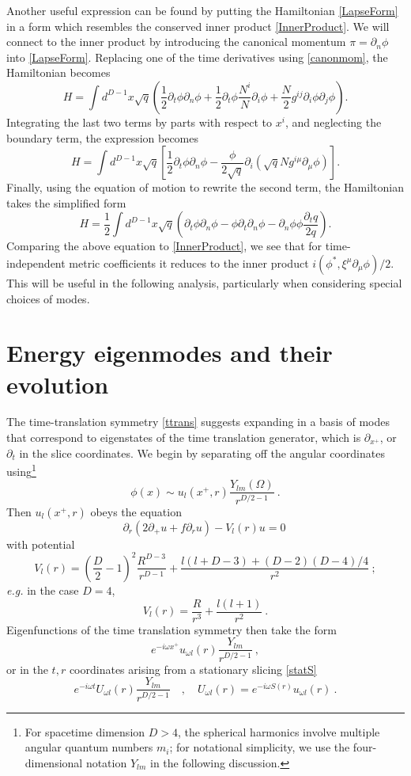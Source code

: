 \documentclass[12pt]{article}
\numberwithin{equation}{section}
\newcommand{\beq}{\begin{equation}}
\newcommand{\eeq}{\end{equation}}
\begin{document}
Another  useful expression can be found by putting the Hamiltonian \eqref{LapseForm} in a form which resembles the conserved inner product \eqref{InnerProduct}. We will connect to the inner product by introducing the canonical momentum $\pi=\partial_n\phi$ into \eqref{LapseForm}. Replacing one of the time derivatives using \eqref{canonmom}, the Hamiltonian becomes
\beq
H= \int d^{D-1}x \sqrt{q}
\left(\frac{1}{2}\partial_t \phi \partial_n\phi + \frac{1}{2}\partial_t\phi\frac{N^i}{N}\partial_i  \phi  +\frac{N}{2}g^{ij} \partial_i \phi \partial_j \phi \right).
\eeq 
Integrating the last two terms by parts with respect to  $x^i$, and neglecting the boundary term, the expression becomes
\beq
H= \int d^{D-1}x \sqrt{q} \left[\frac{1}{2}\partial_t \phi \partial_n\phi -\frac{\phi}{2\sqrt{q}} \partial_i \left(\sqrt{q} N g^{i \mu} \partial_{\mu} \phi \right)\right].
\eeq 
Finally, using the equation of motion to rewrite the second term, the Hamiltonian takes the simplified form
\beq\label{IPform}
H= \frac{1}{2} \int d^{D-1}x \sqrt{q} \left(\partial_t \phi \partial_n\phi -\phi \partial_t \partial_n \phi -\partial_n\phi \phi \frac{\partial_t q}{2q} \right).
\eeq 
Comparing the above equation to \eqref{InnerProduct}, we see that for time-independent metric coefficients it reduces to the inner product $i(\phi^*,\xi^\mu\partial_\mu \phi)/2$.  This will be useful in the following analysis, particularly when considering special choices of modes.

\section{Energy eigenmodes and their evolution}\label{EnergyEmodes}

The time-translation symmetry \eqref{ttrans} suggests expanding in a basis of modes that correspond to eigenstates of the time translation generator, which is  $\partial_{x^+}$, or $\partial_t$ in the slice coordinates. We begin by separating off the angular coordinates using\footnote{For spacetime dimension $D>4$, the spherical harmonics involve multiple angular quantum numbers $m_i$; for notational simplicity, we use the four-dimensional notation $Y_{lm}$ in the following discussion.}
\beq\label{phisep}
\phi(x)\sim u_{l}(x^+,r) \frac{Y_{lm}(\Omega)}{r^{D/2-1}}\ .
\eeq
Then $u_{l}(x^+,r)$ obeys the equation
\beq\label{rxpeq}
\partial_r\left(2\partial_+ u + f\partial_r u\right) - V_l(r)u =0\ 
\eeq
with potential
\beq
V_l(r)= \left(\frac{D}{2}-1\right)^2 \frac{R^{D-3}}{r^{D-1}} +\frac{l(l+D-3)+(D-2)(D-4)/4}{r^{2}}\ ;
\eeq
{\it e.g.} in the case $D=4$, 
\beq\label{4dpot}
V_l(r) = \frac{R}{r^3} + \frac{l(l+1)}{r^2}\ .
\eeq
Eigenfunctions of the time translation symmetry then take the form
\beq\label{Eefcns}
e^{-i\omega x^+}u_{\omega l }(r) \frac{Y_{lm}}{r^{D/2-1}}\ ,
\eeq
or in the $t,r$ coordinates arising from a stationary slicing \eqref{statS}
\beq\label{Trsolns}
e^{-i\omega t}U_{\omega l}(r) \frac{Y_{lm}}{r^{D/2-1}}\quad ,\quad U_{\omega l}(r)= e^{-i\omega S(r)}u_{\omega l}(r)\ .
\eeq
\end{document}

